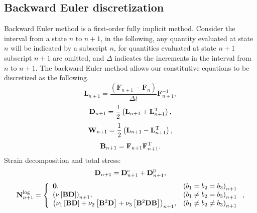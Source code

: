 \subsection{Backward Euler discretization}
\noindent
Backward Euler method is a first-order fully implicit method. Consider the interval from a state $n$ to $n+1$, in the following, any quantity evaluated at state $n$ will be indicated by a subscript $n$, for quantities evaluated at state $n+1$ subscript $n+1$ are omitted, and $\Delta$ indicates the increments in the interval from $n$ to $n+1$. The backward Euler method allows our constitutive equations to be discretized as the following.
\begin{equation}
{{\mathbf{L}}_{n + 1}} = \frac{{\left( {{{\mathbf{F}}_{n + 1}} - {{\mathbf{F}}_n}} \right)}}{{\Delta t}}{\mathbf{F}}_{n + 1}^{ - 1},
\end{equation}
\begin{equation}
{{\mathbf{D}}_{n + 1}} = \frac{1}{2}\left( {{{\mathbf{L}}_{n + 1}} + {\mathbf{L}}_{n + 1}^{\rm{T}}} \right),
\end{equation}
\begin{equation}
{{\mathbf{W}}_{n + 1}} = \frac{1}{2}\left( {{{\mathbf{L}}_{n + 1}} - {\mathbf{L}}_{n + 1}^{\rm{T}}} \right),
\end{equation}
\begin{equation}
{{\mathbf{B}}_{n + 1}} = {{\mathbf{F}}_{n + 1}}{\mathbf{F}}_{n + 1}^{\rm{T}}.
\end{equation}
Strain decomposition and total stress:
\begin{equation}
{\mathbf{D}}_{n + 1} = {\mathbf{D}}^{\rm{e}}_{n + 1} + {\mathbf{D}}^{\rm{p}}_{n + 1},
\end{equation}
\begin{equation}
{\bf{N}}_{n + 1}^{\log } = \left\{ {\begin{array}{*{20}{l}}
{{\bf{0}},}&{{{\left( {{b_1} = {b_2} = {b_3}} \right)}_{n + 1}}}\\
{{{\left( {\nu \left[ {{\bf{BD}}} \right]} \right)}_{n + 1}},}&{{{\left( {{b_1} \ne {b_2} = {b_3}} \right)}_{n + 1}}}\\
{{{\left( {{\nu _1}\left[ {{\bf{BD}}} \right] + {\nu _2}\left[ {{{\bf{B}}^2}{\bf{D}}} \right] + {\nu _3}\left[ {{{\bf{B}}^2}{\bf{DB}}} \right]} \right)}_{n + 1}},}&{{{\left( {{b_1} \ne {b_2} \ne {b_3}} \right)}_{n + 1}}}
\end{array}} \right.
,
\end{equation}
